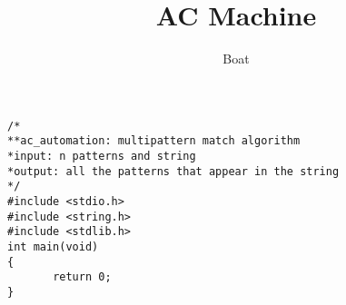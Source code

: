 \documentclass{article}
\title{AC Machine}
\author{Boat}
\begin{document}
\maketitle

\begin{lstlisting}
/*
**ac_automation: multipattern match algorithm
*input: n patterns and string
*output: all the patterns that appear in the string
*/
#include <stdio.h>
#include <string.h>
#include <stdlib.h>
int main(void)
{
       return 0;
}
\end{lstlisting}
\end{document}
